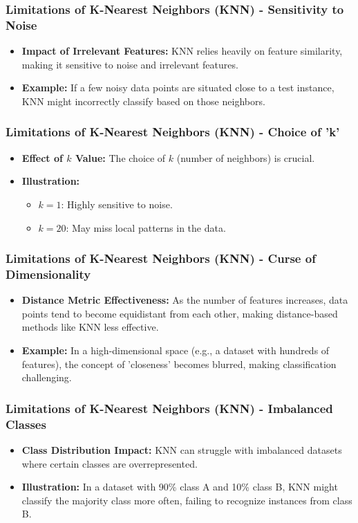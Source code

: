 \documentclass[aspectratio=169]{beamer}
\begin{document}
\begin{frame}[fragile]
    \frametitle{Limitations of K-Nearest Neighbors (KNN) - Sensitivity to Noise}
    \begin{itemize}
        \item \textbf{Impact of Irrelevant Features:} KNN relies heavily on feature similarity, making it sensitive to noise and irrelevant features.
        \item \textbf{Example:} If a few noisy data points are situated close to a test instance, KNN might incorrectly classify based on those neighbors.
    \end{itemize}
\end{frame}

\begin{frame}[fragile]
    \frametitle{Limitations of K-Nearest Neighbors (KNN) - Choice of 'k'}
    \begin{itemize}
        \item \textbf{Effect of $k$ Value:} The choice of $k$ (number of neighbors) is crucial.
        \item \textbf{Illustration:} 
        \begin{itemize}
            \item $k=1$: Highly sensitive to noise.
            \item $k=20$: May miss local patterns in the data.
        \end{itemize}
    \end{itemize}
\end{frame}

\begin{frame}[fragile]
    \frametitle{Limitations of K-Nearest Neighbors (KNN) - Curse of Dimensionality}
    \begin{itemize}
        \item \textbf{Distance Metric Effectiveness:} As the number of features increases, data points tend to become equidistant from each other, making distance-based methods like KNN less effective.
        \item \textbf{Example:} In a high-dimensional space (e.g., a dataset with hundreds of features), the concept of 'closeness' becomes blurred, making classification challenging.
    \end{itemize}
\end{frame}

\begin{frame}[fragile]
    \frametitle{Limitations of K-Nearest Neighbors (KNN) - Imbalanced Classes}
    \begin{itemize}
        \item \textbf{Class Distribution Impact:} KNN can struggle with imbalanced datasets where certain classes are overrepresented.
        \item \textbf{Illustration:} In a dataset with 90\% class A and 10\% class B, KNN might classify the majority class more often, failing to recognize instances from class B.
    \end{itemize}
\end{frame}
\end{document}
